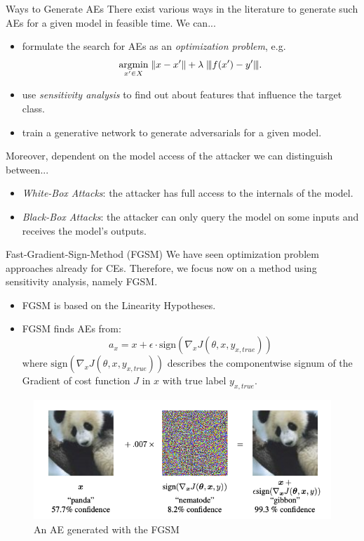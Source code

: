 \documentclass[11pt,compress,t,notes=noshow, xcolor=table]{beamer}
\begin{document}
\begin{vbframe}{Ways to Generate AEs}
There exist various ways in the literature to generate such AEs for a given model in feasible time. We can...
\begin{itemize}
    \item formulate the search for AEs as an \emph{optimization problem}, e.g. 
    \begin{equation*}
        \label{eq:optimization}
        \underset{x'\in X}{\text{argmin}}\; \| x-x' \|+\lambda\;    \vertiii{f(x')-y'}.
    \end{equation*}
    \item use \emph{sensitivity analysis} to find out about features that influence the target class.
    \item train a generative network to generate adversarials for a given model.
\end{itemize}
Moreover, dependent on the model access of the attacker we can distinguish between...
\begin{itemize}
    \item \emph{White-Box Attacks}: the attacker has full access to the internals of the model.
    \item \emph{Black-Box Attacks}: the attacker can only query the model on some inputs and receives the model's outputs.
\end{itemize}
\end{vbframe}

\begin{vbframe}{Fast-Gradient-Sign-Method (FGSM)}
We have seen optimization problem approaches already for CEs. Therefore, we focus now on a method using sensitivity analysis, namely FGSM.
\begin{itemize}
    \item FGSM is based on the Linearity Hypotheses.
    \item FGSM finds AEs from:
    \begin{equation*}
        a_x=x+\epsilon\cdot\text{sign}(\nabla_x J(\theta,x,y_{x,true}))
    \end{equation*}
    where $\text{sign}(\nabla_x J(\theta,x,y_{x,true}))$ describes the componentwise signum of the Gradient of cost function $J$ in $x$ with true label $y_{x,true}$.
\end{itemize}
\begin{figure}[h]
\centering
\includegraphics[width=0.45\linewidth]{figure/AEpanda.png}
  \caption{An AE generated with the FGSM}
  \label{fig:mnist}
\end{figure} 
\end{vbframe}
\end{document}
